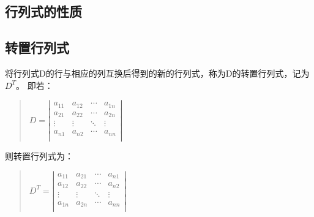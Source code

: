 \documentclass[a4paper,10pt]{article}
\begin{document}
\begin{CJK}{UTF8}{song}
\section{行列式的性质}
\subsection{转置行列式}
将行列式D的行与相应的列互换后得到的新的行列式，称为D的转置行列式，记为$D^{T}$。
即若：
\begin{quote}
$D=\left|\begin{array}{cccc}
a_{11}&a_{12}&\cdots{}&a_{1n} \\
a_{21}&a_{22}&\cdots{}&a_{2n} \\
\vdots&\vdots&\ddots{}&\vdots \\
a_{n1}&a_{n2}&\cdots{}&a_{nn} \\          
\end{array}\right| $
\end{quote}
则转置行列式为：
\begin{quote}
$D^{T}=\left|\begin{array}{cccc}
a_{11}&a_{21}&\cdots{}&a_{n1} \\
a_{12}&a_{22}&\cdots{}&a_{n2} \\
\vdots&\vdots&\ddots{}&\vdots \\
a_{1n}&a_{2n}&\cdots{}&a_{nn} \\          
\end{array}\right| $
\end{quote}


\end{CJK}
\end{document}
